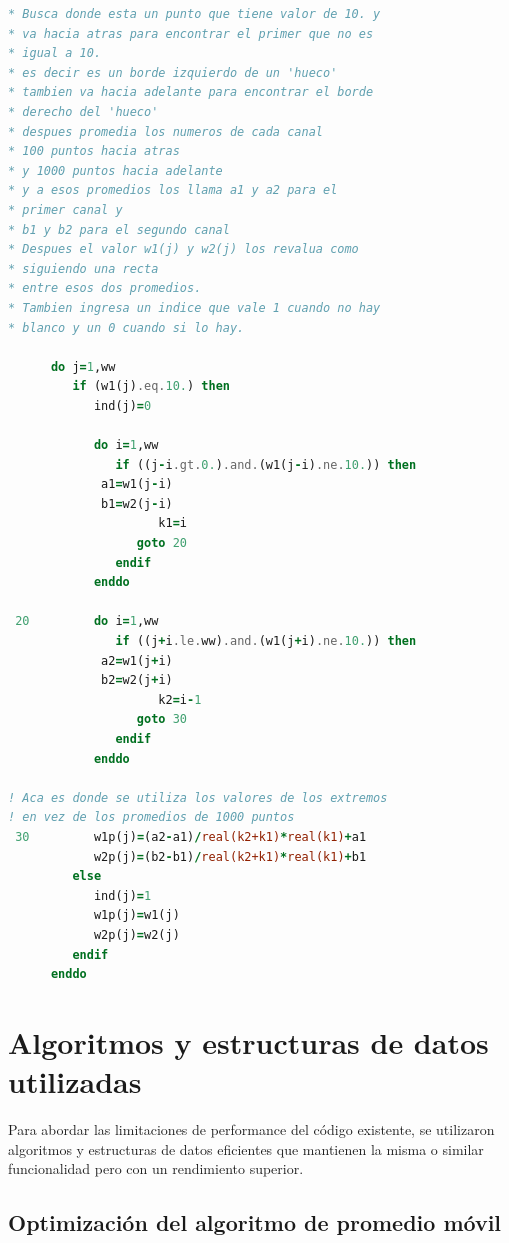 \documentclass[12pt,a4paper]{article}
\begin{document}
\begin{lstlisting}[language=Fortran, label=lst:codigo_error, caption={promedio\_general.f - Error en implementación de rellenado de huecos}]
* Busca donde esta un punto que tiene valor de 10. y 
* va hacia atras para encontrar el primer que no es
* igual a 10.
* es decir es un borde izquierdo de un 'hueco'
* tambien va hacia adelante para encontrar el borde
* derecho del 'hueco'
* despues promedia los numeros de cada canal
* 100 puntos hacia atras
* y 1000 puntos hacia adelante 
* y a esos promedios los llama a1 y a2 para el 
* primer canal y
* b1 y b2 para el segundo canal
* Despues el valor w1(j) y w2(j) los revalua como
* siguiendo una recta 
* entre esos dos promedios.
* Tambien ingresa un indice que vale 1 cuando no hay
* blanco y un 0 cuando si lo hay.

      do j=1,ww
         if (w1(j).eq.10.) then
            ind(j)=0
            
            do i=1,ww
               if ((j-i.gt.0.).and.(w1(j-i).ne.10.)) then
		     a1=w1(j-i)
		     b1=w2(j-i)                  
                     k1=i
                  goto 20
               endif
            enddo
            
 20         do i=1,ww  
               if ((j+i.le.ww).and.(w1(j+i).ne.10.)) then
		     a2=w1(j+i)
		     b2=w2(j+i)                  
                     k2=i-1
                  goto 30
               endif
            enddo

! Aca es donde se utiliza los valores de los extremos
! en vez de los promedios de 1000 puntos
 30         w1p(j)=(a2-a1)/real(k2+k1)*real(k1)+a1
            w2p(j)=(b2-b1)/real(k2+k1)*real(k1)+b1
         else
            ind(j)=1
            w1p(j)=w1(j)
            w2p(j)=w2(j)
         endif
      enddo
\end{lstlisting}

\section{Algoritmos y estructuras de datos utilizadas}
\lhead{}

Para abordar las limitaciones de performance del código existente, se utilizaron algoritmos y estructuras de datos eficientes que mantienen la misma o similar funcionalidad pero con un rendimiento superior.

\subsection{Optimización del algoritmo de promedio móvil}
\end{document}
